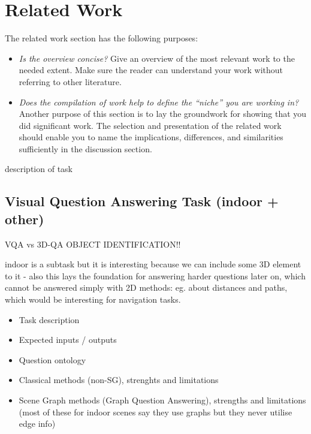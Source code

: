 %

\newpage
\chapter{Related Work}

The related work section has the following purposes: 

\begin{itemize}
 \item \textit{Is the overview concise?} Give an overview of the most relevant work to the needed extent. Make sure the reader can understand your work without referring to other literature.
 \item \textit{Does the compilation of work help to define the ``niche'' you are working in?} Another purpose of this section is to lay the groundwork for showing that you did significant work. The selection and presentation of the related work should enable you to name the implications, differences, and similarities sufficiently in the discussion section.
\end{itemize}

description of task
\section{Visual Question Answering Task (indoor + other)}

VQA vs 3D-QA
OBJECT IDENTIFICATION!!

indoor is a subtask but it is interesting because we can include some 3D element to it
- also this lays the foundation for answering harder questions later on, which cannot be answered simply with 2D methods: eg. about distances and paths, which would be interesting for navigation tasks.
\begin{itemize}
    \item Task description
    \item Expected inputs / outputs
    \item Question ontology
    \item Classical methods (non-SG), strenghts and limitations
    \item Scene Graph methods (Graph Question Answering), strengths and limitations (most of these for indoor scenes say they use graphs but they never utilise edge info)
\end{itemize}

